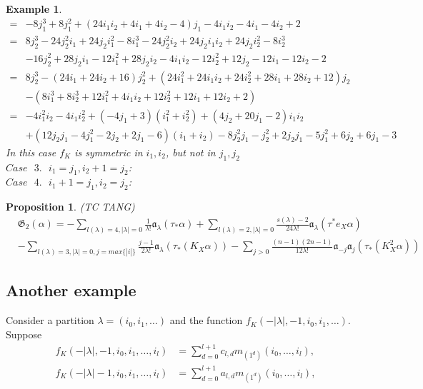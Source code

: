 \documentclass{article}
\newtheorem{prop}{Proposition}[theorem]
\newtheorem{example}{Example}[theorem]
\renewcommand{\frak}[1]{\mathfrak{#1}}
\begin{document}
\begin{example}
\[\begin{aligned}
= &-8j_1^3+8j_1^2+(24i_1i_2 + 4i_1 + 4i_2 - 4)j_1- 4i_1i_2 - 4i_1 - 4i_2 + 2\\
= &8j_2^3 - 24j_2^2i_1 + 24j_2i_1^2 - 8i_1^3 - 24j_2^2i_2 + 24j_2i_1i_2 + 24j_2i_2^2 - 8i_2^3\\
& - 16j_2^2 + 28j_2i_1 - 12i_1^2 + 28j_2i_2 - 4i_1i_2 - 12i_2^2 + 12j_2 - 12i_1 - 12i_2 - 2\\
= &8j_2^3 - (24i_1 + 24i_2 + 16)j_2^2 + (24i_1^2 + 24i_1i_2 + 24i_2^2 + 28i_1 + 28i_2 + 12)j_2\\
& - (8i_1^3 + 8i_2^3 + 12i_1^2 + 4i_1i_2 + 12i_2^2 + 12i_1 + 12i_2 + 2)\\
= &-4i_1^2i_2 - 4i_1i_2^2 + (-4j_1 + 3)(i_1^2 + i_2^2)+ (4j_2 + 20j_1 - 2)i_1i_2\\
& + (12j_2j_1 - 4j_1^2 - 2j_2 + 2j_1 - 6)(i_1 + i_2) -8j_2^2j_1 - j_2^2 + 2j_2j_1 - 5j_1^2 + 6j_2 + 6j_1 - 3
\end{aligned}
\]
In this case $f_K$ is symmetric in $i_1,i_2$, but not in $j_1,j_2$
\\
$\mathit{Case\text{ }3.}\text{ } i_1=j_1,i_2+1=j_2$:
\\
$\mathit{Case\text{ }4.}\text{ } i_1+1=j_1,i_2=j_2$:
\end{example}
\begin{prop}{(TC TANG)}
\[
\begin{aligned}
&\frak{G}_2(\alpha) = -\sum_{l(\lambda)=4,|\lambda|=0}\frac{1}{\lambda!}\frak{a}_{\lambda}(\tau_*\alpha) + \sum_{l(\lambda) = 2,|\lambda|=0}\frac{s(\lambda)-2}{24\lambda!}\frak{a}_{\lambda}(\tau^*e_X\alpha)\\
& - \sum_{l(\lambda) = 3, |\lambda| = 0, j = max\{|i|\}}\frac{j-1}{2\lambda!}\frak{a}_\lambda(\tau_*(K_X\alpha))-\sum_{j>0}\frac{(n-1)(2n-1)}{12\lambda!}\frak{a}_{-j}\frak{a}_j(\tau_*(K_X^2\alpha))
\end{aligned}
\]
\end{prop}

\subsection{Another example}

Consider a partition $\lambda = (i_0,i_1,\ldots)$ and the function $f_K(-|\lambda|, -1,i_0,i_1,\ldots)$. Suppose
\[
\begin{aligned}
f_K(-|\lambda|, -1,i_0,i_1,\ldots,i_l) &= \sum_{d=0}^{l+1} c_{l,d}m_{(1^d)}(i_0,\ldots,i_l),\\
f_K(-|\lambda| -1,i_0,i_1,\ldots,i_l) &= \sum_{d=0}^{l+1} a_{l,d}m_{(1^d)}(i_0,\ldots,i_l),
\end{aligned}
\]
\end{document}
